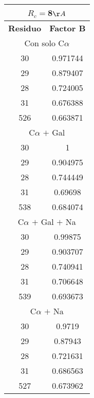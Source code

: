 \begin{tabular}[c]{|c|c|}
\multicolumn{2}{c}{$R_c=$8$\AA$}\\\hline
\textbf{Residuo}&\textbf{Factor B}\\\hline
\multicolumn{2}{c}{Con solo C$\alpha$}\\\hline
        30&  0.971744\\
        29&  0.879407\\
        28&  0.724005\\
        31&  0.676388\\
       526&  0.663871\\
\hline
\multicolumn{2}{c}{C$\alpha$ $+$ Gal}\\\hline
        30&         1\\
        29&  0.904975\\
        28&  0.744449\\
        31&   0.69698\\
       538&  0.684074\\
\hline
\multicolumn{2}{c}{C$\alpha$ $+$ Gal $+$ Na}\\\hline
        30&   0.99875\\
        29&  0.903707\\
        28&  0.740941\\
        31&  0.706648\\
       539&  0.693673\\
\hline
\multicolumn{2}{c}{C$\alpha$ $+$ Na}\\\hline
        30&    0.9719\\
        29&   0.87943\\
        28&  0.721631\\
        31&  0.686563\\
       527&  0.673962\\
\hline
\end{tabular}
